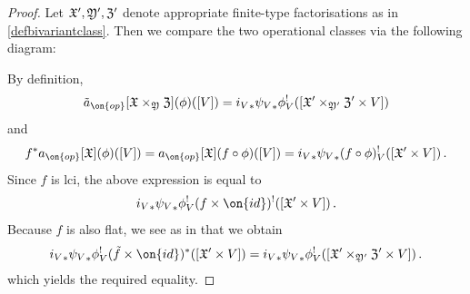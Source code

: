 \begin{proof}
Let $\frak X', \frak Y', \frak Z'$ denote appropriate finite-type factorisations as in \cref{defbivariantclass}. Then we compare the two operational classes via the following diagram:


By definition,
\[\tilde{a}_{\on{op}} [\frak X \times_{\frak Y} \frak Z] (\phi)([V]) = {i_V}_* {\psi_V}_* \phi_V^! ([\frak X'\times_{\frak Y'} \frak Z' \times V]) \]
and
\[f^* a_{\on{op}}[\frak X](\phi)([V]) = a_{\on{op}}[\frak X](f \circ \phi)([V])  = {i_V}_* {\psi_V}_* (f \circ \phi)_V^! ([\frak X'\times V])\, .\]
Since $f$ is lci, the above expression is equal to
\[{i_V}_* {\psi_V}_* \phi_V^! (f \times \on{id})^! ([\frak X'\times V])\, .\]
Because $f$ is also flat, we see as in  \cite[Prop 6.6(b)]{Fulton1984Intersection-th} that we obtain
\[{i_V}_* {\psi_V}_* \phi_V^! (\tilde{f} \times \on{id})^* ([\frak X'\times V]) = {i_V}_* {\psi_V}_* \phi_V^! ([\frak X' \times_{\frak Y'} \frak Z' \times V])\, . \]
which yields the required equality.
\end{proof}

